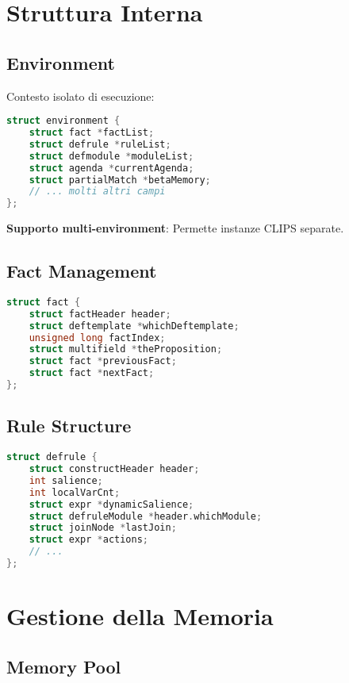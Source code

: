 \section{Struttura Interna}

\subsection{Environment}

Contesto isolato di esecuzione:

\begin{lstlisting}[language=C]
struct environment {
    struct fact *factList;
    struct defrule *ruleList;
    struct defmodule *moduleList;
    struct agenda *currentAgenda;
    struct partialMatch *betaMemory;
    // ... molti altri campi
};
\end{lstlisting}

\textbf{Supporto multi-environment}: Permette instanze CLIPS separate.

\subsection{Fact Management}

\begin{lstlisting}[language=C]
struct fact {
    struct factHeader header;
    struct deftemplate *whichDeftemplate;
    unsigned long factIndex;
    struct multifield *theProposition;
    struct fact *previousFact;
    struct fact *nextFact;
};
\end{lstlisting}

\subsection{Rule Structure}

\begin{lstlisting}[language=C]
struct defrule {
    struct constructHeader header;
    int salience;
    int localVarCnt;
    struct expr *dynamicSalience;
    struct defruleModule *header.whichModule;
    struct joinNode *lastJoin;
    struct expr *actions;
    // ...
};
\end{lstlisting}

\section{Gestione della Memoria}

\subsection{Memory Pool}

